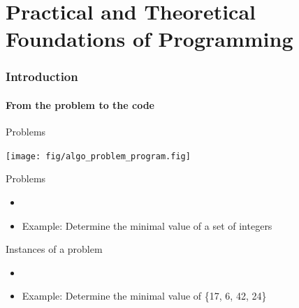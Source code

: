 \part{Practical and Theoretical Foundations of Programming}
\label{intro}\toc

\section{Introduction}
\subsection{From the problem to the code}
\begin{frame}[t]{Problems}
  \null\vspace{-.7\baselineskip}
  \centerline{\texttt{[image: fig/algo\_problem\_program.fig]}}

  \medskip

  \begin{block}{Problems}
    \begin{itemize}
    \item {}
    \item[] Example: Determine the minimal value of a set of integers
    \end{itemize}
  \end{block}

  \begin{block}{Instances of a problem}
    \begin{itemize}
    \item {}
    \item[] Example: Determine the minimal value of \{17, 6, 42, 24\}
    \end{itemize}    
  \end{block}
\end{frame}
